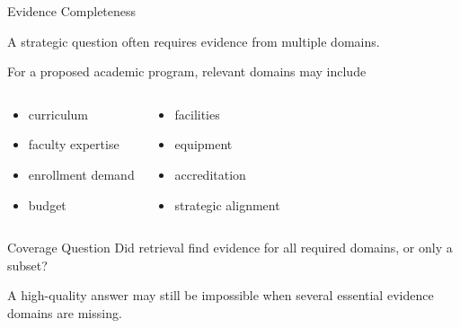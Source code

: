 \documentclass[aspectratio=169]{beamer}
\begin{document}
\begin{frame}{Evidence Completeness}

A strategic question often requires evidence from multiple domains.

\vspace{0.4cm}

For a proposed academic program, relevant domains may include
\begin{columns}[T]


\begin{block}

\begin{itemize}
\item curriculum
\item faculty expertise
\item enrollment demand
\item budget
\end{itemize}

\end{block}


\begin{block}

\begin{itemize}
\item facilities
\item equipment
\item accreditation
\item strategic alignment
\end{itemize}

\end{block}

\end{columns}

\vspace{0.35cm}

\begin{block}{Coverage Question}
Did retrieval find evidence for all required domains, or only a subset?
\end{block}

\vspace{0.25cm}

A high-quality answer may still be impossible when several essential
evidence domains are missing.

\end{frame}

\end{document}
